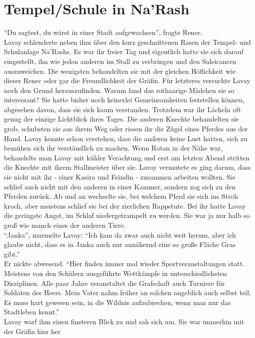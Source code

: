 \chapter{Tempel/Schule in Na'Rash}

``Du sagtest, du wärst in einer Stadt aufgewachsen'', fragte Renec.\\
Lavay schlenderte neben ihm über den kurz geschnittenen Rasen der Tempel- und Schulanlage Na'Rashs. 
Es war ihr freier Tag und eigentlich hatte sie sich darauf eingestellt, ihn wie jeden anderen im 
Stall zu verbringen und den Saleicanern auszuweichen. Die wenigsten behandelten sie mit der 
gleichen Höflichkeit wie dieser Renec oder gar die Freundlichkeit der Gräfin. Für letzteres 
versuchte Lavay noch den Grund herauszufinden. Warum fand das rothaarige Mädchen sie so 
interessant? Sie hatte bisher noch keinerlei Gemeinsamkeiten feststellen können, abgesehen davon, 
dass sie sich kaum verstanden. Trotzdem war ihr Lächeln oft genug der einzige Lichtblick ihres 
Tages. Die anderen Knechte behandelten sie grob, schubsten sie aus ihrem Weg oder rissen ihr die 
Zügel eines Pferdes aus der Hand. Lavay konnte schon verstehen, dass die anderen keine Lust hatten, 
sich zu bemühen sich ihr verständlich zu machen. Wenn Rotan in der Nähe war, behandelte man Lavay 
mit kühler Verachtung und erst am letzten Abend stritten die Knechte mit ihrem Stallmeister über 
sie. Lavay vermutete es ging darum, dass sie nicht mit ihr - einer Kasira und Feindin - zusammen 
arbeiten wollten. Sie schlief auch nicht mit den anderen in einer Kammer, sondern zog sich zu den 
Pferden zurück. Ab und an wechselte sie, bei welchem Pferd sie sich ins Stroh kroch, aber meistens 
schlief sie bei der zierlichen Rappstute. Bei ihr hatte Lavay die geringste Angst, im Schlaf 
niedergetrampelt zu werden. Sie war ja nur halb so groß wie manch eines der anderen Tiere.\\
``Janka'', murmelte Lavay: ``Ich kam da zwar auch nicht weit herum, aber ich glaube nicht, dass es 
in Janka auch nur annähernd eine so große Fläche Gras gibt.''\\
Er nickte abwesend. ``Hier finden immer mal wieder Sportveranstaltungen statt. Meistens von den 
Schülern ausgeführte Wettkämpfe in unterschiedlichsten Disziplinen. Alle paar Jahre veranstaltet 
die Grafschaft auch Turniere für Soldaten des Heers. Mein Vater nahm früher an solchen angeblich 
auch selbst teil. Es muss hart gewesen sein, in die Wildnis aufzubrechen, wenn man nur das 
Stadtleben kennt.''\\
Lavay warf ihm einen finsteren Blick zu und sah sich um. Sie war immerhin mit der Gräfin hier her 
